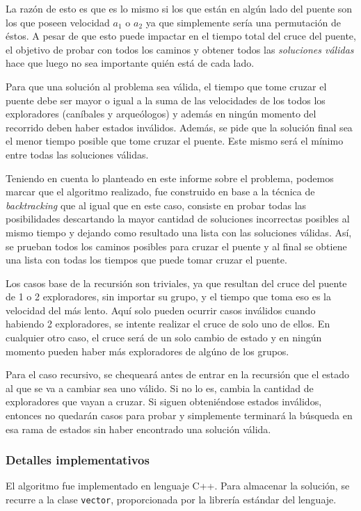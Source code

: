         La razón de esto es que es lo mismo si los que están en algún lado del puente son los que poseen velocidad $a_1$ o $a_2$ ya que simplemente sería una permutación de éstos. A pesar de que esto puede impactar en el tiempo total del cruce del puente, el objetivo de probar con todos los caminos y obtener todos las \emph{soluciones válidas} hace que luego no sea importante quién está de cada lado.

        Para que una solución al problema sea válida, el tiempo que tome cruzar el puente debe ser mayor o igual a la suma de las velocidades de los todos los exploradores (caníbales y arqueólogos) y además en ningún momento del recorrido deben haber estados inválidos. Además, se pide que la solución final sea el menor tiempo posible que tome cruzar el puente. Este mismo será el mínimo entre todas las soluciones válidas.

        Teniendo en cuenta lo planteado en este informe sobre el problema, podemos marcar que el algoritmo realizado, fue construido en base a la técnica de \emph{backtracking} que al igual que en este caso, consiste en probar todas las posibilidades descartando la mayor cantidad de soluciones incorrectas posibles al mismo tiempo y dejando como resultado una lista con las soluciones válidas. Así, se prueban todos los caminos posibles para cruzar el puente y al final se obtiene una lista con todas los tiempos que puede tomar cruzar el puente.

        Los casos base de la recursión son triviales, ya que resultan del cruce del puente de 1 o 2 exploradores, sin importar su grupo, y el tiempo que toma eso es la velocidad del más lento. Aquí solo pueden ocurrir casos inválidos cuando habiendo 2 exploradores, se intente realizar el cruce de solo uno de ellos. En cualquier otro caso, el cruce será de un solo cambio de estado y en ningún momento pueden haber más exploradores de algúno de los grupos.

        Para el caso recursivo, se chequeará antes de entrar en la recursión que el estado al que se va a cambiar sea uno válido. Si no lo es, cambia la cantidad de exploradores que vayan a cruzar. Si siguen obteniéndose estados inválidos, entonces no quedarán casos para probar y simplemente terminará la búsqueda en esa rama de estados sin haber encontrado una solución válida.

        \subsubsection{Detalles implementativos}
            El algoritmo fue implementado en lenguaje C++. Para almacenar la solución, se recurre a la clase \texttt{vector}, proporcionada por la librería estándar del lenguaje.

